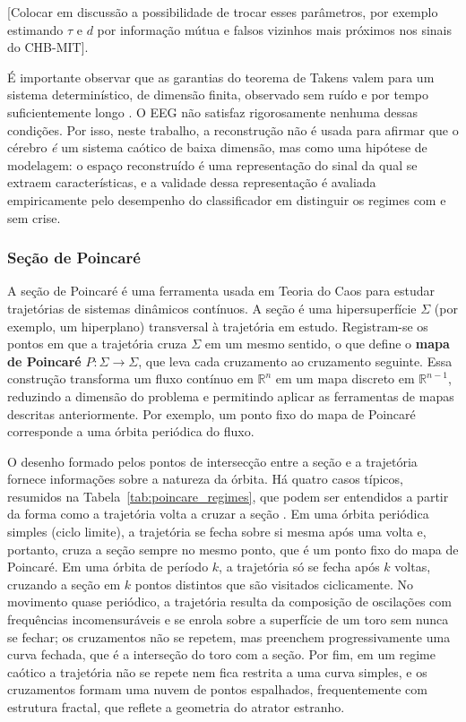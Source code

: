 \documentclass[]{article}
\begin{document}
	[Colocar em discussão a possibilidade de trocar esses parâmetros, por exemplo estimando $\tau$ e $d$ por informação mútua e falsos vizinhos mais próximos nos sinais do CHB-MIT].

	É importante observar que as garantias do teorema de Takens valem para um sistema determinístico, de dimensão finita, observado sem ruído e por tempo suficientemente longo \cite{takens1981detecting, sauer1991embedology}. O EEG não satisfaz rigorosamente nenhuma dessas condições. Por isso, neste trabalho, a reconstrução não é usada para afirmar que o cérebro \emph{é} um sistema caótico de baixa dimensão, mas como uma hipótese de modelagem: o espaço reconstruído é uma representação do sinal da qual se extraem características, e a validade dessa representação é avaliada empiricamente pelo desempenho do classificador em distinguir os regimes com e sem crise.

	\subsubsection{Seção de Poincaré}
	\label{subsubsec:poincare}
	\noindent
	A seção de Poincaré é uma ferramenta usada em Teoria do Caos para estudar trajetórias de sistemas dinâmicos contínuos. A seção é uma hipersuperfície $\Sigma$ (por exemplo, um hiperplano) transversal à trajetória em estudo. Registram-se os pontos em que a trajetória cruza $\Sigma$ em um mesmo sentido, o que define o \textbf{mapa de Poincaré} $P: \Sigma \to \Sigma$, que leva cada cruzamento ao cruzamento seguinte. Essa construção transforma um fluxo contínuo em $\mathbb{R}^n$ em um mapa discreto em $\mathbb{R}^{n-1}$, reduzindo a dimensão do problema e permitindo aplicar as ferramentas de mapas descritas anteriormente. Por exemplo, um ponto fixo do mapa de Poincaré corresponde a uma órbita periódica do fluxo.

	O desenho formado pelos pontos de intersecção entre a seção e a trajetória fornece informações sobre a natureza da órbita. Há quatro casos típicos, resumidos na Tabela~\ref{tab:poincare_regimes}, que podem ser entendidos a partir da forma como a trajetória volta a cruzar a seção \cite{strogatz2015nonlinear}. Em uma órbita periódica simples (ciclo limite), a trajetória se fecha sobre si mesma após uma volta e, portanto, cruza a seção sempre no mesmo ponto, que é um ponto fixo do mapa de Poincaré. Em uma órbita de período $k$, a trajetória só se fecha após $k$ voltas, cruzando a seção em $k$ pontos distintos que são visitados ciclicamente. No movimento quase periódico, a trajetória resulta da composição de oscilações com frequências incomensuráveis e se enrola sobre a superfície de um toro sem nunca se fechar; os cruzamentos não se repetem, mas preenchem progressivamente uma curva fechada, que é a interseção do toro com a seção. Por fim, em um regime caótico a trajetória não se repete nem fica restrita a uma curva simples, e os cruzamentos formam uma nuvem de pontos espalhados, frequentemente com estrutura fractal, que reflete a geometria do atrator estranho.
\end{document}
